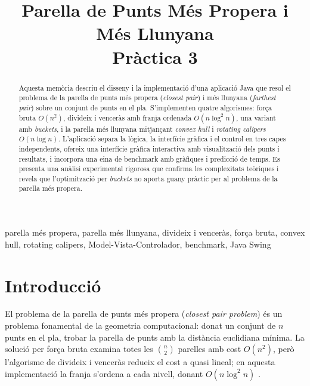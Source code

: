 \documentclass[conference,compsoc]{IEEEtran}
\begin{document}
\title{Parella de Punts Més Propera i Més Llunyana\\ Pràctica 3}

\author{
}

\maketitle

\begin{strip}
\begin{abstract}
Aquesta memòria descriu el disseny i la implementació d'una aplicació Java
que resol el problema de la parella de punts més propera (\textit{closest pair})
i més llunyana (\textit{farthest pair}) sobre un conjunt de punts en el pla.
S'implementen quatre algorismes: força bruta $O(n^2)$, divideix i
venceràs amb franja ordenada $O(n \log^2 n)$, una variant amb \textit{buckets},
i la parella més llunyana mitjançant \textit{convex hull} i
\textit{rotating calipers} $O(n \log n)$.
L'aplicació separa la lògica, la interfície gràfica i el control en tres capes independents, ofereix una interfície gràfica interactiva
amb visualització dels punts i resultats, i incorpora una eina de benchmark
amb gràfiques i predicció de temps.
Es presenta una anàlisi experimental rigorosa que confirma les complexitats
teòriques i revela que l'optimització per \textit{buckets} no aporta guany
pràctic per al problema de la parella més propera.
\end{abstract}

\begin{IEEEkeywords}
parella més propera, parella més llunyana, divideix i venceràs, força bruta,
convex hull, rotating calipers, Model-Vista-Controlador, benchmark, Java Swing
\end{IEEEkeywords}
\end{strip}

\IEEEpeerreviewmaketitle

\section{Introducció}

El problema de la parella de punts més propera (\textit{closest pair problem})
és un problema fonamental de la geometria computacional: donat un conjunt
de $n$ punts en el pla, trobar la parella de punts amb la distància
euclidiana mínima. La solució per força bruta examina totes les
$\binom{n}{2}$ parelles amb cost $O(n^2)$, però l'algorisme de divideix
i venceràs redueix el cost a quasi lineal; en aquesta implementació
la franja s'ordena a cada nivell, donant $O(n \log^2 n)$ \cite{ref_gfg_closest}.
\end{document}
